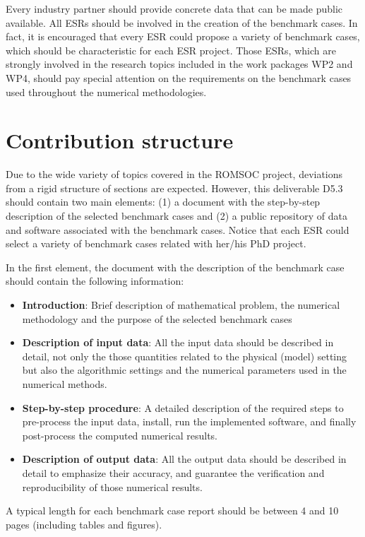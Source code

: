 Every industry partner should provide concrete data that can be made
public available. All \ac{ESR}s should be involved in the creation of the benchmark cases. In fact, it is encouraged that every \ac{ESR} could propose a variety of benchmark cases, which should be characteristic for each ESR project. Those ESRs, which are strongly involved in the research topics 
included in the work packages WP2 and WP4, should pay special attention on the requirements on the benchmark cases used throughout the numerical methodologies.

\section{Contribution structure}
Due to the wide variety of topics covered in the \acs{ROMSOC} project, deviations from a rigid structure of sections are expected. However, this deliverable D5.3 should contain two main elements: (1) a document with the step-by-step description of the selected benchmark cases and (2) a public repository of data and software associated with the benchmark cases. Notice that each ESR could select a variety of benchmark cases related with her/his PhD project.

In the first element, the document with the description of the benchmark case should contain the following information:
\begin{itemize}
\item \textbf{Introduction}: Brief description of mathematical problem, the numerical methodology and the purpose of the selected benchmark cases
\item \textbf{Description of input data}: All the input data should be described in detail, not only the those quantities related to the physical (model) setting but also the algorithmic settings and the numerical parameters used in the numerical methods.
\item \textbf{Step-by-step procedure}: A detailed description of the required steps to pre-process the input data, install, run the implemented software, and finally post-process the computed numerical results.
\item \textbf{Description of output data}: All the output data should be described in detail to emphasize their accuracy, and guarantee the verification and reproducibility of those numerical results. 
\end{itemize}
A typical length for each benchmark case report should be between 4 and 10 pages (including tables and figures).

